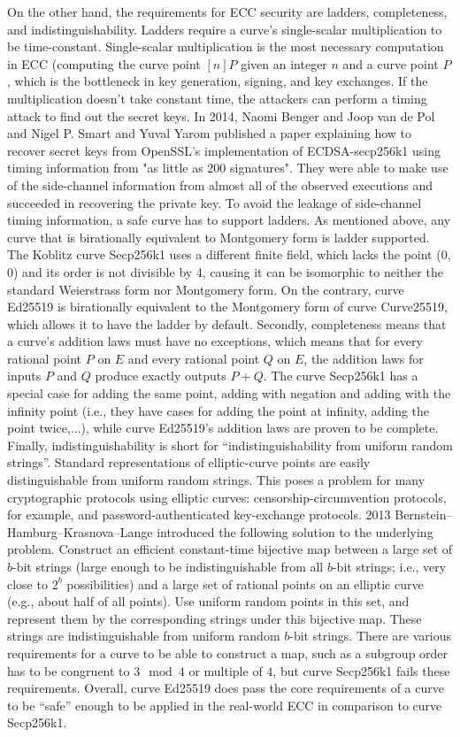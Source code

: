 On the other hand, the requirements for ECC security are ladders, completeness, and indistinguishability. Ladders require a curve’s single-scalar multiplication to be time-constant. Single-scalar multiplication is the most necessary computation in ECC (computing the curve point $[n]P$ given an integer $n$ and a curve point $P$, which is the bottleneck in key generation, signing, and key exchanges. If the multiplication doesn’t take constant time, the attackers can perform a timing attack to find out the secret keys. In 2014, Naomi Benger and Joop van de Pol and Nigel P. Smart and Yuval Yarom published a paper explaining how to recover secret keys from OpenSSL's implementation of ECDSA-secp256k1 using timing information from "as little as 200 signatures". They were able to make use of the side-channel information from almost all of the observed executions and succeeded in recovering the private key. To avoid the leakage of side-channel timing information, a safe curve has to support ladders.  As mentioned above, any curve that is birationally equivalent to Montgomery form is ladder supported. The Koblitz curve Secp256k1 uses a different finite field, which lacks the point (0, 0) and its order is not divisible by 4, causing it can be isomorphic to neither the standard Weierstrass form nor Montgomery form. On the contrary, curve Ed25519 is birationally equivalent to the Montgomery form of curve Curve25519, which allows it to have the ladder by default. Secondly, completeness means that a curve’s addition laws must have no exceptions, which means that for every rational point $P$ on $E$ and every rational point $Q$ on $E$, the addition laws for inputs $P$ and $Q$ produce exactly outputs $P + Q$. The curve Secp256k1 has a special case for adding the same point, adding with negation and adding with the infinity point  (i.e., they have cases for adding the point at infinity, adding the point twice,...), while curve Ed25519’s addition laws are proven to be complete. Finally, indistinguishability is short for “indistinguishability from uniform random strings”. Standard representations of elliptic-curve points are easily distinguishable from uniform random strings. This poses a problem for many cryptographic protocols using elliptic curves: censorship-circumvention protocols, for example, and password-authenticated key-exchange protocols. 2013 Bernstein–Hamburg–Krasnova–Lange introduced the following solution to the underlying problem. Construct an efficient constant-time bijective map between a large set of $b$-bit strings (large enough to be indistinguishable from all $b$-bit strings; i.e., very close to $2^b$ possibilities) and a large set of rational points on an elliptic curve (e.g., about half of all points). Use uniform random points in this set, and represent them by the corresponding strings under this bijective map. These strings are indistinguishable from uniform random $b$-bit strings. There are various requirements for a curve to be able to construct a map, such as a subgroup order has to be congruent to $3 \mod 4$ or multiple of $4$, but curve Secp256k1 fails these requirements. Overall, curve Ed25519 does pass the core requirements of a curve to be “safe” enough to be applied in the real-world ECC in comparison to curve Secp256k1.


